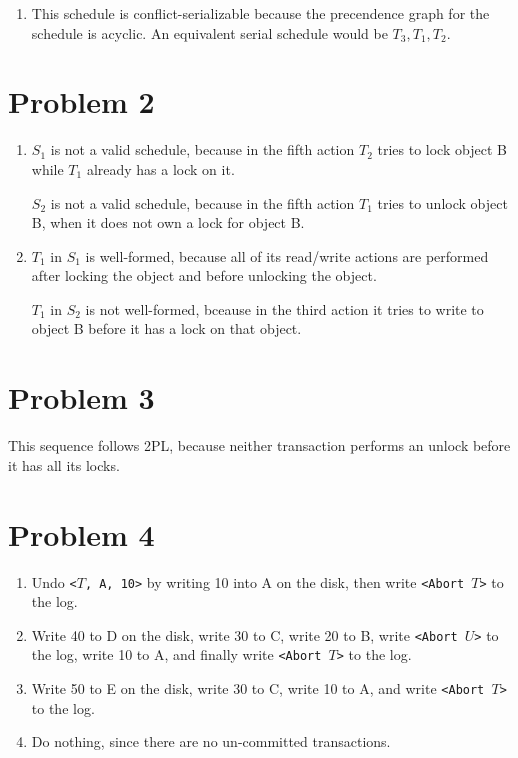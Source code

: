 \documentclass[a4paper, 12pt]{article}
\begin{document}
\begin{enumerate}[label=\textbf{S\arabic*:}]
\begin{enumerate}[label=Q\arabic*:]
			\item This schedule is conflict-serializable because the precendence
				graph for the schedule is acyclic. An equivalent serial schedule
				would be $T_3, T_1, T_2$.
		\end{enumerate}
\end{enumerate}

\section*{Problem 2}

\begin{enumerate}[label=Q\arabic*:]
	\item $S_1$ is not a valid schedule, because in the fifth action $T_2$ tries
		to lock object B while $T_1$ already has a lock on it.

		$S_2$ is not a valid schedule, because in the fifth action $T_1$ tries
		to unlock object B, when it does not own a lock for object B.
	\item $T_1$ in $S_1$ is well-formed, because all of its read/write actions
		are performed after locking the object and before unlocking the object.

		$T_1$ in $S_2$ is not well-formed, bceause in the third action it tries
		to write to object B before it has a lock on that object.
\end{enumerate}

\section*{Problem 3}

This sequence follows 2PL, because neither transaction performs an unlock before
it has all its locks.

\section*{Problem 4}

\begin{enumerate}[label=(\alph*)]
	\item Undo \texttt{<$T$, A, 10>} by writing 10 into A on the disk, then
		write \texttt{<Abort $T$>} to the log.
	\item Write 40 to D on the disk, write 30 to C, write 20 to B, write
		\texttt{<Abort $U$>} to the log, write 10 to A, and finally write
		\texttt{<Abort $T$>} to the log.
	\item Write 50 to E on the disk, write 30 to C, write 10 to A, and write
		\texttt{<Abort $T$>} to the log.
	\item Do nothing, since there are no un-committed transactions.

\end{enumerate}
\end{document}
